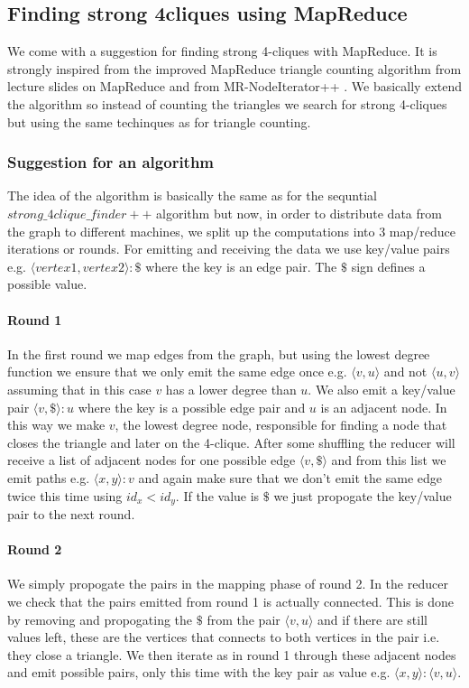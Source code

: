 \documentclass{article}
\begin{document}
\subsection{Finding strong 4cliques using MapReduce}
We come with a suggestion for finding strong 4-cliques with MapReduce. It is strongly inspired from the improved MapReduce triangle counting algorithm from lecture slides on MapReduce \cite{lnMapReduce} and from MR-NodeIterator++ \cite{countingTriangles}. We basically extend the algorithm so instead of counting the triangles we search for strong 4-cliques but using the same techinques as for triangle counting.

\subsubsection{Suggestion for an algorithm}
The idea of the algorithm is basically the same as for the sequntial $strong\_4clique\_finder++$ algorithm but now, in order to distribute data from the graph to different machines, we split up the computations into 3 map/reduce iterations or rounds. For emitting and receiving the data we use key/value pairs e.g. $\langle vertex1,vertex2\rangle :\$$ where the key is an edge pair. The $\$$ sign defines a possible value.

\paragraph{Round 1}
In the first round we map edges from the graph, but using the lowest degree function we ensure that we only emit the same edge once e.g. $\langle v,u\rangle$ and not $\langle u,v\rangle$ assuming that in this case $v$ has a lower degree than $u$. We also emit a key/value pair $\langle v,\$\rangle :u$ where the key is a possible edge pair and $u$ is an adjacent node. In this way we make $v$, the lowest degree node, responsible for finding a node that closes the triangle and later on the 4-clique. After some shuffling the reducer will receive a list of adjacent nodes for one possible edge $\langle v,\$\rangle$ and from this list we emit paths e.g. $\langle x,y\rangle :v$ and again make sure that we don't emit the same edge twice this time using $id_x < id_y$. If the value is $\$$ we just propogate the key/value pair to the next round.

\paragraph{Round 2}
We simply propogate the pairs in the mapping phase of round 2. In the reducer we check that the pairs emitted from round 1 is actually connected. This is done by removing and propogating the $\$$ from the pair $\langle v,u\rangle$ and if there are still values left, these are the vertices that connects to both vertices in the pair i.e. they close a triangle. We then iterate as in round 1 through these adjacent nodes and emit possible pairs, only this time with the key pair as value e.g. $\langle x,y \rangle :\langle v,u \rangle$.
\end{document}
